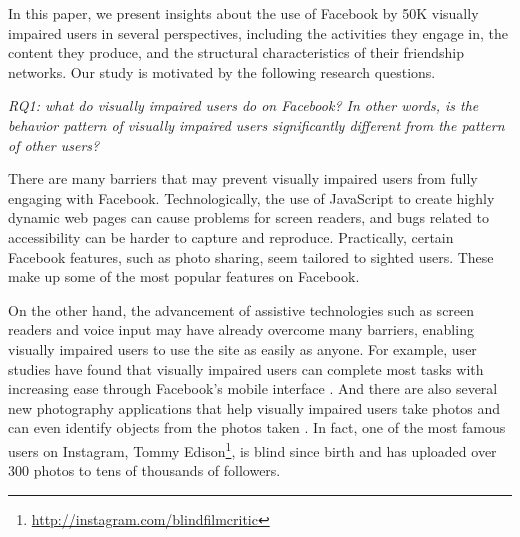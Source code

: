 \documentclass{sigchi}
\begin{document}
 


In this paper, we present insights about the use of Facebook by 50K visually impaired users in several perspectives, including the activities they engage in, the content they produce, and the structural characteristics of their friendship networks. Our study is motivated by the following research questions.

\emph{RQ1: what do visually impaired users do on Facebook? In other words, is the behavior pattern of visually impaired users significantly different from the pattern of other users?}
 
There are many barriers that may prevent visually impaired users from fully engaging with Facebook. Technologically, the use of  JavaScript to create highly dynamic web pages can cause problems for screen readers, and bugs related to accessibility can be harder to capture and reproduce. Practically, certain Facebook features, such as photo sharing, seem tailored to sighted users. These make up some of the most popular features on Facebook.  

On the other hand, the advancement of assistive technologies such as screen readers and voice input may have  already overcome many barriers, enabling visually impaired users to use the site as easily as anyone. For example, user studies have found that visually impaired users can complete most tasks with increasing ease through Facebook's mobile interface \cite{wentz2011}. And there are also several new photography applications that help visually impaired users take photos and can even identify objects from the photos taken \cite{jayant2011, taptapsee}. In fact, one of the most famous users on Instagram, Tommy Edison\footnote{\url{http://instagram.com/blindfilmcritic}}, is blind since birth and has uploaded over 300 photos to tens of thousands of followers.
\end{document}
